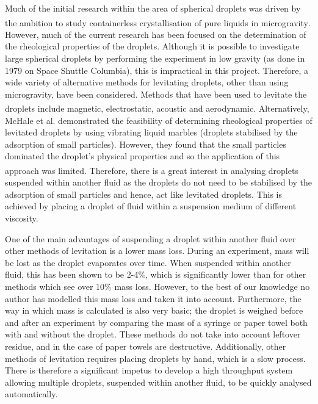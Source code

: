 \documentclass{physics_article_B}
\begin{document}
    Much of the initial research within the area of spherical droplets was driven by the ambition to study containerless crystallisation of pure liquids in microgravity\textsuperscript{\cite{wilkes}}. However, much of the current research has been focused on the determination of the rheological properties of the droplets. Although it is possible to investigate large spherical droplets by performing the experiment in low gravity (as done in 1979\cite{holt} on Space Shuttle Columbia), this is impractical in this project. Therefore, a wide variety of alternative methods for levitating droplets, other than using microgravity, have been considered. Methods that have been used to levitate the droplets include magnetic\textsuperscript{\cite{temperton, hill}}, electrostatic\textsuperscript{\cite{mugele, wong}}, acoustic\textsuperscript{\cite{trinh, Yarin1998}} and aerodynamic\textsuperscript{\cite{benmore}}. Alternatively, McHale et al. demonstrated the feasibility of determining rheological properties of levitated droplets by using vibrating liquid marbles (droplets stabilised by the adsorption of small particles). However, they found that the small particles dominated the droplet's physical properties and so the application of this approach was limited\textsuperscript{\cite{mchale}}. Therefore, there is a great interest in analysing droplets suspended within another fluid as the droplets do not need to be stabilised by the adsorption of small particles and hence, act like levitated droplets. This is achieved by placing a droplet of fluid within a suspension medium of different viscosity. 
    
    One of the main advantages of suspending a droplet within another fluid over other methods of levitation is a lower mass loss. During an experiment, mass will be lost as the droplet evaporates over time. When suspended within another fluid, this has been shown to be 2-4\%, which is significantly lower than for other methods which see over 10\% \cite{harrold2} mass loss. However, to the best of our knowledge no author has modelled this mass loss and taken it into account. Furthermore, the way in which mass is calculated is also very basic; the droplet is weighed before and after an experiment by comparing the mass of a syringe or paper towel both with and without the droplet. These methods do not take into account leftover residue, and in the case of paper towels are destructive. Additionally, other methods of levitation requires placing droplets by hand, which is a slow process. There is therefore a significant impetus to develop a high throughput system allowing multiple droplets, suspended within another fluid, to be quickly analysed automatically.
\end{document}
